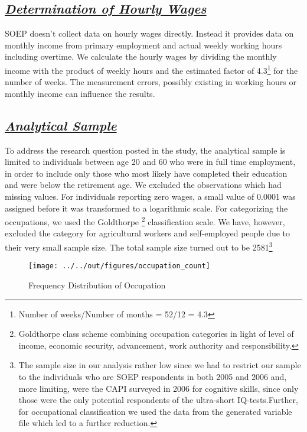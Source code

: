 \documentclass[11pt, a4paper, leqno]{article}
\begin{document}
\subsection*{\textit{\underline{Determination of Hourly Wages }}}

SOEP doesn’t collect data on hourly wages directly. Instead it provides data on monthly income from primary employment and actual weekly working hours including overtime. We calculate the hourly wages by dividing the monthly income with the product of weekly hours and the estimated factor of 4.3\footnote{Number of weeks/Number of months = 52/12 = 4.3} for the number of weeks. The measurement errors, possibly existing in working hours or monthly income can influence the results. 

\subsection*{\textit{\underline{Analytical Sample}}}

To address the research question posted in the study, the analytical sample is limited to individuals between age 20 and 60  who were in full time employment, in order to include only those who most likely have completed their education and were below the retirement age. We excluded the observations which had missing values. For individuals reporting zero wages, a small value of 0.0001 was assigned before it was transformed to a logarithmic scale. For categorizing the occupations, we used the  Goldthorpe \footnote{ Goldthorpe class scheme combining occupation categories in light of level of income, economic security, advancement, work authority and responsibility.  
} classification scale.  We have, however,  excluded the category for  agricultural workers and self-employed people due to their very small sample size. The total sample size turned out to be 2581\footnote{The sample size in our analysis rather low since we had to restrict our sample to the  individuals who are SOEP respondents in both 2005 and 2006 and, more limiting, were the CAPI surveyed in 2006 for cognitive skills, since only those were the only potential respondents of the ultra-short IQ-tests.Further, for occupational classification we used the data from the generated variable file which led to a further reduction.}


\begin{figure}
    \caption{Frequency Distribution of Occupation}
    
    \texttt{[image: ../../out/figures/occupation\_count]}

\end{figure}
\end{document}
